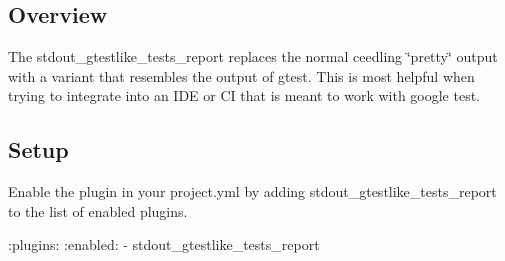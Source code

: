 \subsection*{Overview}

The stdout\+\_\+gtestlike\+\_\+tests\+\_\+report replaces the normal ceedling \char`\"{}pretty\char`\"{} output with a variant that resembles the output of gtest. This is most helpful when trying to integrate into an I\+DE or CI that is meant to work with google test.

\subsection*{Setup}

Enable the plugin in your project.\+yml by adding {\ttfamily stdout\+\_\+gtestlike\+\_\+tests\+\_\+report} to the list of enabled plugins.


\begin{DoxyCode}
:plugins:
  :enabled:
    - stdout\_gtestlike\_tests\_report
\end{DoxyCode}
 